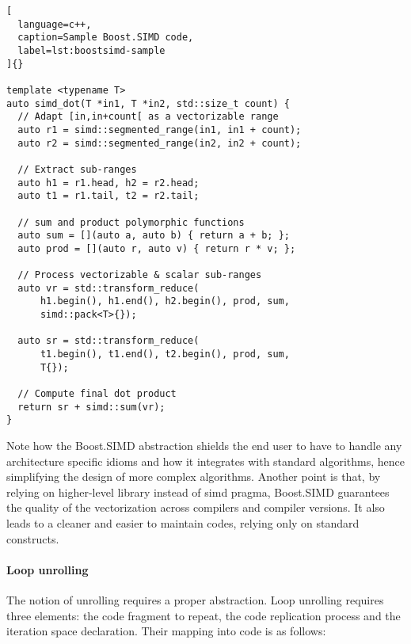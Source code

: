 \documentclass[../main]{subfiles}
\begin{document}
\begin{lstlisting}[
  language=c++,
  caption=Sample Boost.SIMD code,
  label=lst:boostsimd-sample
]{}

template <typename T>
auto simd_dot(T *in1, T *in2, std::size_t count) {
  // Adapt [in,in+count[ as a vectorizable range
  auto r1 = simd::segmented_range(in1, in1 + count);
  auto r2 = simd::segmented_range(in2, in2 + count);

  // Extract sub-ranges
  auto h1 = r1.head, h2 = r2.head;
  auto t1 = r1.tail, t2 = r2.tail;

  // sum and product polymorphic functions
  auto sum = [](auto a, auto b) { return a + b; };
  auto prod = [](auto r, auto v) { return r * v; };

  // Process vectorizable & scalar sub-ranges
  auto vr = std::transform_reduce(
      h1.begin(), h1.end(), h2.begin(), prod, sum,
      simd::pack<T>{});

  auto sr = std::transform_reduce(
      t1.begin(), t1.end(), t2.begin(), prod, sum,
      T{});

  // Compute final dot product
  return sr + simd::sum(vr);
}
\end{lstlisting}

Note how the Boost.SIMD abstraction shields the end
user to have to handle any architecture specific idioms
and how it integrates with standard algorithms, hence
simplifying the design of more complex algorithms.
Another point is that, by relying on higher-level library
instead of \gls{simd} pragma, Boost.SIMD guarantees
the quality of the vectorization across compilers and
compiler versions. It also leads to a cleaner and easier to
maintain codes, relying only on standard \cpp constructs.

\paragraph{Loop unrolling} The notion of unrolling requires
a proper abstraction. Loop unrolling requires three
elements: the code fragment to repeat, the code
replication process and the iteration space declaration.
Their mapping into \cpp code is as follows:
\end{document}
